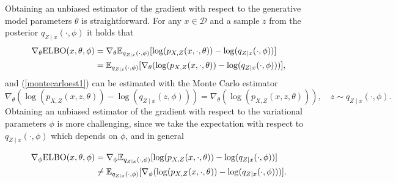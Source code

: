 Obtaining an unbiased estimator of the gradient with respect to the generative model parameters $\theta$ is straightforward. For any $x \in \mathcal{D}$ and a sample $z$ from the posterior $q_{Z\mid x}(\cdot,\phi)$ it holds that
\begin{equation}\label{montecarloest1}
\begin{split}
	\nabla_{\theta} \mathrm{ELBO}(x,\theta, \phi) &= \nabla_{\theta} \mathbb{E}_{q_{Z\mid x}(\cdot,\phi)}[\log(p_{X,Z}(x, \cdot, \theta)) - \log(q_{Z\mid x}(\cdot, \phi))] \\
	&= \mathbb{E}_{q_{Z\mid x}(\cdot,\phi)}[\nabla_{\theta}(\log(p_{X,Z}(x, \cdot, \theta)) - \log(q_{Z\mid x}(\cdot, \phi)))],
\end{split}
\end{equation}
and (\ref{montecarloest1}) can be estimated with the Monte Carlo estimator 
$$	\nabla_{\theta}(\log(p_{X,Z}(x, z, \theta)) - \log(q_{Z\mid x}(z, \phi))) = \nabla_{\theta}(\log(p_{X,Z}(x, z, \theta))), \quad z \sim q_{Z\mid x}(\cdot,\phi).
$$
Obtaining an unbiased estimator of the gradient with respect to the variational parameters $\phi$ is more challenging, since we take the expectation with respect to $q_{Z\mid x}(\cdot,\phi)$ which depends on $\phi$, and in general

\begin{equation*}
\begin{split}
	\nabla_{\phi} \mathrm{ELBO}(x,\theta, \phi) &= \nabla_{\phi} \mathbb{E}_{q_{Z\mid x}(\cdot,\phi)}[\log(p_{X,Z}(x, \cdot, \theta)) - \log(q_{Z\mid x}(\cdot, \phi))] \\
	&\neq \mathbb{E}_{q_{Z\mid x}(\cdot,\phi)}[\nabla_{\phi}(\log(p_{X,Z}(x, \cdot, \theta)) - \log(q_{Z\mid x}(\cdot, \phi)))].
\end{split}
\end{equation*}

